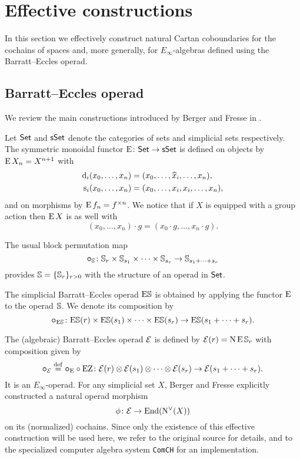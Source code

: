 
\section{Effective constructions}\label{s:effective}

In this section we effectively construct natural Cartan coboundaries for the cochains of spaces and, more generally, for $E_\infty$-algebras defined using the Barratt--Eccles operad.

\subsection{Barratt--Eccles operad}

We review the main constructions introduced by Berger and Fresse in \cite{berger2004combinatorial}.

Let $\mathsf{Set}$ and $\mathsf{sSet}$ denote the categories of sets and simplicial sets respectively.
The symmetric monoidal functor $\operatorname{E} \colon \mathsf{Set} \to \mathsf{sSet}$ is defined on objects by $\operatorname{E} X_n = X^{n+1}$ with
\[
\begin{split}
	\operatorname{d}_i(x_0,\dots,x_n) &= (x_0,\dots,\widehat{x}_i,\dots,x_n), \\
	\operatorname{s}_i(x_0,\dots,x_n) &= (x_0, \dots, x_i, x_i, \dots, x_n),
\end{split}
\]
and on morphisms by $\operatorname{E} f_n = f^{\times n}$.
We notice that if $X$ is equipped with a group action then $\operatorname{E} X$ is as well with
\[
(x_0,\dots,x_n) \cdot g = (x_0 \cdot g, \dots, x_n \cdot g).
\]

The usual block permutation map
\[
\bm{\circ}_{\mathbb{S}} \colon \mathbb{S}_r \times \mathbb{S}_{s_1} \times \cdots \times \mathbb{S}_{s_r} \to \mathbb{S}_{s_1+\dots+s_r}
\]
provides $\mathbb{S} = \{\mathbb{S}_r\}_{r>0}$ with the structure of an operad in $\mathsf{Set}$.

The simplicial Barratt--Eccles operad $\mathrm{E}\mathbb{S}$ is obtained by applying the functor $\operatorname{E}$ to the operad $\mathbb{S}$.
We denote its composition by
\[
\bm{\circ}_{\mathrm{E}\mathbb{S}} \colon
\mathrm{E}\mathbb{S}(r) \times \mathrm{E}\mathbb{S}(s_1) \times\dots\times \mathrm{E}\mathbb{S}(s_r) \to
\mathrm{E}\mathbb{S}(s_1+\dots+s_r).
\]

The (algebraic) Barratt--Eccles operad $\mathcal{E}$ is defined by $\mathcal{E}(r) = \operatorname{N}\operatorname{E}\mathbb{S}_r$ with composition given by
\[
\bm{\circ}_{\mathcal{E}} \stackrel{\mathrm{def}}{=} \bm{\circ}_{\operatorname{E}} \circ \operatorname{EZ} \colon \mathcal{E}(r) \otimes \mathcal{E}(s_1) \otimes\dotsb\otimes \mathcal{E}(s_r) \to \mathcal{E}(s_1+\dots+s_r).
\]
It is an $E_\infty$-operad.
For any simplicial set $X$, Berger and Fresse explicitly constructed a natural operad morphism
\[
\phi \colon \mathcal{E} \to \mathrm{End}(\operatorname{N^{\vee}}(X))
\]
on its (normalized) cochains.
Since only the existence of this effective construction will be used here, we refer to the original source for details, and to the specialized computer algebra system \texttt{ComCH} for an implementation.

